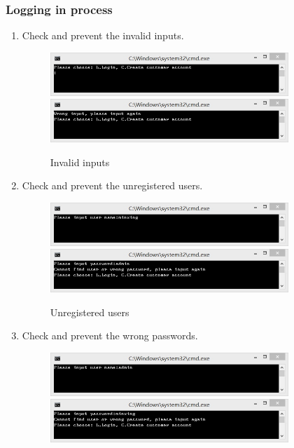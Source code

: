 \documentclass{article}
\begin{document}
\subsubsection{Logging in process}
\begin{enumerate}
    \item Check and prevent the invalid inputs. 
        \begin{figure}[H]
        \centering
        \includegraphics[width=0.85\textwidth]{login/00.jpg}
        \includegraphics[width=0.85\textwidth]{login/01.jpg}
        \caption{Invalid inputs}
        \end{figure}
    \item Check and prevent the unregistered users.
        \begin{figure}[H]
        \centering
        \includegraphics[width=0.85\textwidth]{login/21a.jpg}
        \includegraphics[width=0.85\textwidth]{login/21c.jpg}
        \caption{Unregistered users}
        \end{figure}
    \item Check and prevent the wrong passwords.
        \begin{figure}[H]
        \centering
        \includegraphics[width=0.85\textwidth]{login/22a.jpg}
        \includegraphics[width=0.85\textwidth]{login/22c.jpg}

\end{figure}
\end{enumerate}
\end{document}
